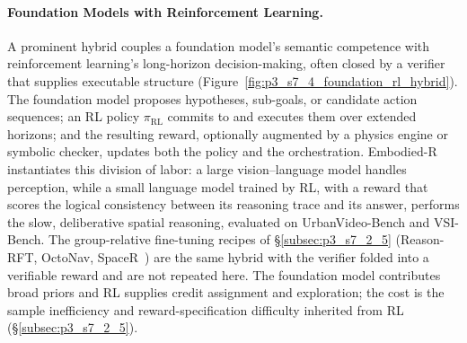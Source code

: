 \paragraph{Foundation Models with Reinforcement Learning.}
A prominent hybrid couples a foundation model's semantic competence with reinforcement learning's long-horizon decision-making, often closed by a verifier that supplies executable structure (Figure~\ref{fig:p3_s7_4_foundation_rl_hybrid}).
The foundation model proposes hypotheses, sub-goals, or candidate action sequences; an RL policy $\pi_{\mathrm{RL}}$ commits to and executes them over extended horizons; and the resulting reward, optionally augmented by a physics engine or symbolic checker, updates both the policy and the orchestration.
Embodied-R~\cite{zhao2025embodied} instantiates this division of labor: a large vision--language model handles perception, while a small language model trained by RL, with a reward that scores the logical consistency between its reasoning trace and its answer, performs the slow, deliberative spatial reasoning, evaluated on UrbanVideo-Bench and VSI-Bench.
The group-relative fine-tuning recipes of §\ref{subsec:p3_s7_2_5} (Reason-RFT, OctoNav, SpaceR~\cite{tan2025reasonrft,gao2026octonav,ouyang2025spacer}) are the same hybrid with the verifier folded into a verifiable reward and are not repeated here.
The foundation model contributes broad priors and RL supplies credit assignment and exploration; the cost is the sample inefficiency and reward-specification difficulty inherited from RL (§\ref{subsec:p3_s7_2_5}).

